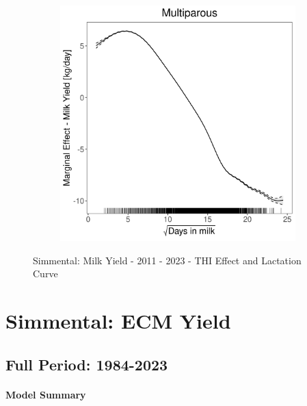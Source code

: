 \begin{figure}[H]
\begin{subfigure}[b]{0.45\textwidth}
    \end{subfigure}
    \hspace{0.05\textwidth} %
    \begin{subfigure}[b]{0.45\textwidth}
        \centering
        \includegraphics[width=\textwidth]{thesis/figures/models/milk/after2010/si_milk_after2010/si_milk_after2010_marginal_dim_milk_multi.png}
    \end{subfigure}
    \caption[]{Simmental: Milk Yield - 2011 - 2023 - THI Effect and Lactation Curve}
    \label{fig:main}
\end{figure}

\section{Simmental: ECM Yield}
\subsection{Full Period: 1984-2023}\label{model:si_ecm_full}
\paragraph{Model Summary} \quad \\


